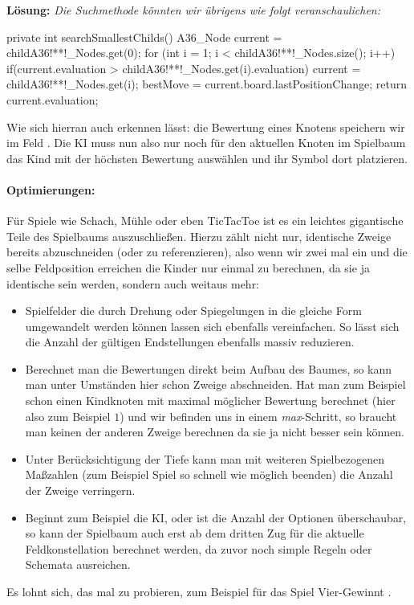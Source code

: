 \documentclass[table]{sopra-base}
\makeatletter
\newenvironment{solution}{\null\par\noindent\textbf{\textcolor{sob@col@uulm@cs}{Lösung:}}\newline\bgroup\color{black}\slshape\ignorespaces}{\egroup}
\makeatother
\begin{document}
\begin{solution}
Die Suchmethode könnten wir übrigens wie folgt veranschaulichen:
{\upshape
\begin{java}[firstnumber=104]
private int searchSmallestChilds(){
    A36_Node current = childA36!**!_Nodes.get(0);
    for (int i = 1; i < childA36!**!_Nodes.size(); i++) {
        if(current.evaluation > childA36!**!_Nodes.get(i).evaluation)
            current = childA36!**!_Nodes.get(i);
    }
    bestMove = current.board.lastPositionChange;
    return current.evaluation;
}
\end{java}
}
Wie sich hierran auch erkennen lässt: die Bewertung eines Knotens speichern wir im Feld . Die KI muss nun also nur noch für den aktuellen Knoten im Spielbaum das Kind mit der höchsten Bewertung auswählen und ihr Symbol dort platzieren.

\paragraph{Optimierungen:}

Für Spiele wie Schach, Mühle oder eben TicTacToe ist es ein leichtes gigantische Teile des Spielbaums auszuschließen. Hierzu zählt nicht nur, identische Zweige bereits abzuschneiden (oder zu referenzieren), also wenn wir zwei mal ein und die selbe Feldposition erreichen die Kinder nur einmal zu berechnen, da sie ja identische sein werden, sondern auch weitaus mehr:
\begin{itemize}[nolistsep]
    \item Spielfelder die durch Drehung oder Spiegelungen in die gleiche Form umgewandelt werden können lassen sich ebenfalls vereinfachen. So lässt sich die Anzahl der gültigen Endstellungen ebenfalls massiv reduzieren.
    \item Berechnet man die Bewertungen direkt beim Aufbau des Baumes, so kann man unter Umständen hier schon Zweige abschneiden. Hat man zum Beispiel schon einen Kindknoten mit maximal möglicher Bewertung berechnet (hier also zum Beispiel \(1\)) und wir befinden uns in einem \emph{max}-Schritt, so braucht man keinen der anderen Zweige berechnen da sie ja nicht besser sein können.
    \item Unter Berücksichtigung der Tiefe kann man mit weiteren Spielbezogenen Maßzahlen (zum Beispiel Spiel so schnell wie möglich beenden) die Anzahl der Zweige verringern. 
    \item Beginnt zum Beispiel die KI, oder ist die Anzahl der Optionen überschaubar, so kann der Spielbaum auch erst ab dem dritten Zug für die aktuelle Feldkonstellation berechnet werden, da zuvor noch simple Regeln oder Schemata ausreichen.
\end{itemize}
Es lohnt sich, das mal zu probieren, zum Beispiel für das Spiel Vier-Gewinnt \Smiley.
\egroup
\end{solution}
\end{document}
